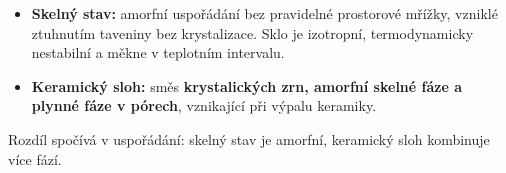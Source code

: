 \begin{itemize}
\item \textbf{Skelný stav:} amorfní uspořádání bez pravidelné prostorové mřížky, vzniklé ztuhnutím taveniny bez krystalizace. Sklo je izotropní, termodynamicky nestabilní a měkne v teplotním intervalu.
\item \textbf{Keramický sloh:} směs \textbf{krystalických zrn, amorfní skelné fáze a plynné fáze v pórech}, vznikající při výpalu keramiky.
\end{itemize}
Rozdíl spočívá v uspořádání: skelný stav je amorfní, keramický sloh kombinuje více fází.
